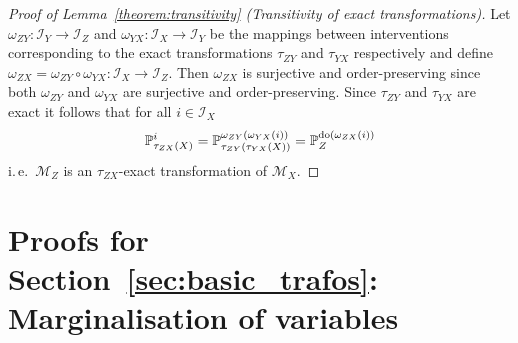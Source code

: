 \begin{proof}[Proof of Lemma~\ref{theorem:transitivity} (Transitivity of exact transformations)]
    Let $\omega_{ZY}:\mathcal{I}_Y \to \mathcal{I}_Z$ and $\omega_{YX}:\mathcal{I}_X \to \mathcal{I}_Y$ be the mappings between interventions corresponding to the exact transformations $\tau_{ZY}$ and $\tau_{YX}$ respectively and define $\omega_{ZX} = \omega_{ZY}\circ\omega_{YX}:\mathcal{I}_X \to \mathcal{I}_Z$.
    Then $\omega_{ZX}$ is surjective and order-preserving since both $\omega_{ZY}$ and $\omega_{YX}$ are surjective and order-preserving.
    Since $\tau_{ZY}$ and $\tau_{YX}$ are exact it follows that for all $i\in\mathcal{I}_X$
    \begin{align*}
        \mathbb{P}^{i}_{\tau_{ZX}(X)}
        =
        \mathbb{P}^{ \omega_{ZY}(\omega_{YX}(i))}_{\tau_{ZY}(\tau_{YX}(X))}
        =
        \mathbb{P}^{\operatorname{do}(\omega_{ZX}(i))}_{Z}
    \end{align*}
    i.\,e.\ $\mathcal{M}_Z$ is an $\tau_{ZX}$-exact transformation of $\mathcal{M}_X$.
\end{proof}





\section{Proofs for Section~\ref{sec:basic_trafos}: Marginalisation of variables}\label{marginalisation:appendix}

